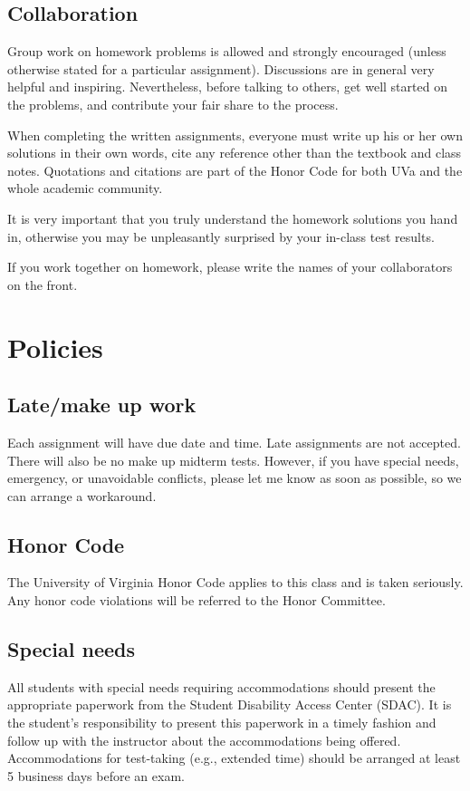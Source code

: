 \documentclass[oneside,11pt]{amsart}
\begin{document}
\subsection{Collaboration}

Group work on homework problems is allowed and strongly encouraged (unless otherwise stated for a particular assignment). Discussions are in general very helpful and inspiring. Nevertheless, before talking to others, get well started on the problems, and contribute your fair share to the process. 

When completing the written assignments, everyone must write up his or her own solutions in their own words, cite any reference other than the textbook and class notes. Quotations and citations are part of the Honor Code for both UVa and the whole academic community. 

It is very important that you truly understand the homework solutions you hand in, otherwise you may be unpleasantly surprised by your in-class test results.

If you work together on homework, please write the names of your collaborators on the front.

\label{academic_integrity}

\section{Policies}

\subsection{Late/make up work}
Each assignment will have due date and time. Late assignments are not accepted. There will also be no make up midterm tests. However, if you have special needs, emergency, or unavoidable conflicts, please let me know as soon as possible, so we can arrange a workaround.

\subsection{Honor Code}
The University of Virginia Honor Code applies to this class and is taken seriously. Any honor code violations will be referred to the Honor Committee.

\subsection{Special needs}

All students with special needs requiring accommodations should present the appropriate paperwork from the Student Disability Access Center (SDAC). It is the student's responsibility to present this paperwork in a timely fashion and follow up with the instructor about the accommodations being offered. Accommodations for test-taking (e.g., extended time) should be arranged at least 5 business days before an exam.
\end{document}
